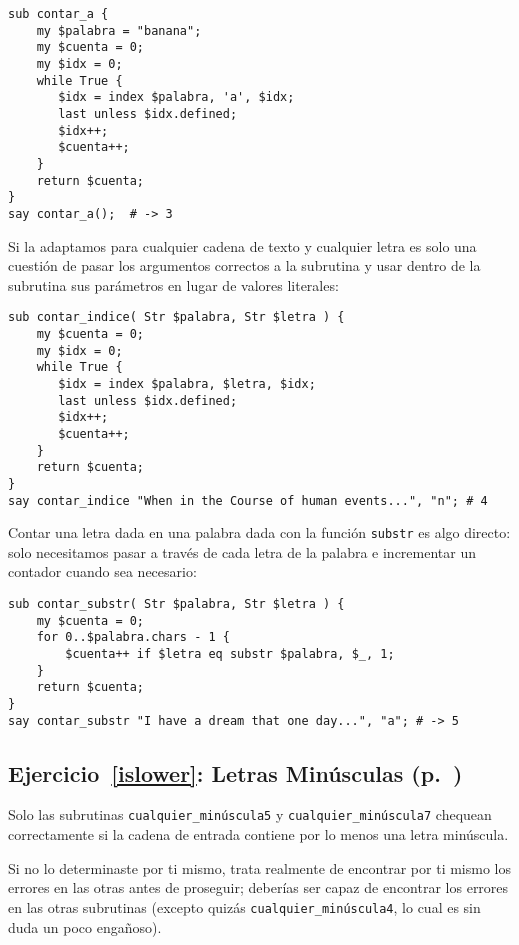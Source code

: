 \begin{verbatim}
sub contar_a {
    my $palabra = "banana";
    my $cuenta = 0;
    my $idx = 0;
    while True {
       $idx = index $palabra, 'a', $idx;
       last unless $idx.defined;
       $idx++;
       $cuenta++;
    }
    return $cuenta;
}
say contar_a();  # -> 3
\end{verbatim}

Si la adaptamos para cualquier cadena de texto y cualquier letra
es solo una cuestión de pasar los argumentos correctos a la subrutina
y usar dentro de la subrutina sus parámetros en lugar de valores literales:

\begin{verbatim}
sub contar_indice( Str $palabra, Str $letra ) {
    my $cuenta = 0;
    my $idx = 0;
    while True {
       $idx = index $palabra, $letra, $idx;
       last unless $idx.defined;
       $idx++;
       $cuenta++;
    }
    return $cuenta;
}
say contar_indice "When in the Course of human events...", "n"; # 4
\end{verbatim}

Contar una letra dada en una palabra dada con la función {\tt substr} 
es algo directo: solo necesitamos pasar a través de cada letra de
la palabra e incrementar un contador cuando sea necesario:

\begin{verbatim}
sub contar_substr( Str $palabra, Str $letra ) {
    my $cuenta = 0;
    for 0..$palabra.chars - 1 {
        $cuenta++ if $letra eq substr $palabra, $_, 1;
    }
    return $cuenta;
}
say contar_substr "I have a dream that one day...", "a"; # -> 5
\end{verbatim}

\subsection{Ejercicio~\ref{islower}: Letras Minúsculas (p.~\pageref{islower})}
\label{sol_islower}

Solo las subrutinas \verb|cualquier_minúscula5| y \verb|cualquier_minúscula7|
chequean correctamente si la cadena de entrada contiene por lo menos 
una letra minúscula.

Si no lo determinaste por ti mismo, trata realmente de encontrar
por ti mismo los errores en las otras antes de proseguir; deberías
ser capaz de encontrar los errores en las otras subrutinas (excepto 
quizás \verb|cualquier_minúscula4|, lo cual es sin duda 
un poco engañoso).

